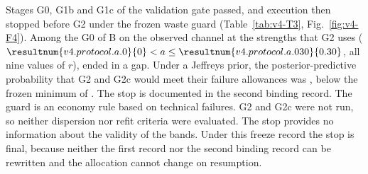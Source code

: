 Stages G0, G1b and G1c of the validation gate passed, and execution then stopped before G2 under the frozen waste guard (Table~\ref{tab:v4-T3}, Fig.~\ref{fig:v4-F4}). %
Among the  G0  of B on the observed channel at the strengths that G2 uses ($\resultnum{v4.protocol.a.0}{0}<a\le \resultnum{v4.protocol.a.030}{0.30}$, all nine values of $r$),  ended in a gap. %
Under a Jeffreys prior, the posterior-predictive probability that G2 and G2c would meet their failure allowances was , below the frozen minimum of . The stop is documented in the second binding record. %
The guard is an economy rule based on technical failures. G2 and G2c were not run, so neither dispersion nor refit criteria were evaluated. The stop provides no information about the validity of the bands. %
Under this freeze record the stop is final, because neither the first record nor the second binding record can be rewritten and the allocation cannot change on resumption. %


